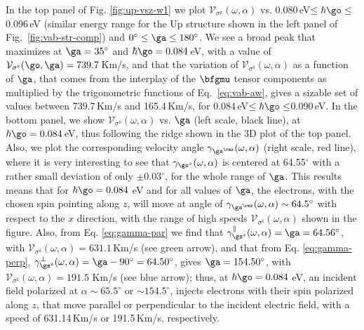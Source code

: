 \documentclass[floatfix,prb,aps,superscriptaddress,showpacs,11pt,preprint,letterpaper]{revtex4}
\begin{document}
In the top panel of Fig. \ref{fig:up-vsz-w1} we plot
$\mathcal{V}_{\sigma^{\mathrm{z}}} (\omega,\alpha)$ vs.
0.080\,eV$\leq\hbar\go\leq$0.096\,eV (similar energy range for the Up
structure shown in the left panel of Fig.~\ref{fig:vab-str-comp}) and
$0^\circ\leq\ga\leq 180^\circ$.
% 
We see a broad peak that maximizes at $\ga=35^{\circ}$ and $\hbar\go=
0.084$\,eV, with a value of $\mathcal{V}_{\sigma^{\mathrm{z}}}(\go,\ga) =
739.7$\,Km/s, and that the variation of $\mathcal{V}_{\sigma^{\mathrm{z}}}
(\omega,\alpha)$ as a function of $\ga$, that comes from the interplay of the
$\bfgmu$ tensor components as multiplied by the  trigonometric functions of
Eq.~\eqref{eq:vab-aw}, gives a sizable set of values between 739.7\,Km/s and
165.4\,Km/s, for 0.084\,eV$\leq\hbar\go\leq$0.090\,eV. 
% 
In the bottom panel, we show $\mathcal{V}_{\sigma^{\mathrm{z}}}
(\omega,\alpha)$ vs. $\ga$ (left scale, black line), at $\hbar\go= 0.084$\,eV,
thus following the ridge shown in the 3D plot of the top panel. 
Also,
we plot the
corresponding velocity angle $\gamma_{\gs^\rmz}(\omega,\alpha)$
(right scale, red line),
where it is very interesting to see that $\gamma_{\gs^z}(\omega,\alpha)$ is centered
at 64.55$^\circ$ with a rather small deviation of only $\pm 0.03^\circ$,
for the whole range of $\ga$. This results means that for $\hbar\go=0.084$ eV
and for all values of $\ga$, the electrons, with the chosen spin pointing along
$z$, will move at angle of $\gamma_{\gs^\rmz}(\omega,\alpha) \sim
64.5^{\circ}$ with respect to the $x$ direction, with the range of  high
speeds $\mathcal{V}_{\sigma^{\mathrm{z}}} (\omega,\alpha)$ shown in the figure.
% 
Also, from Eq. \eqref{eq:gamma-par} we find that
$\gamma^\parallel_{\gs^\mathrm{z}} (\omega,\alpha)=\ga = 64.56^\circ$, with
$\mathcal{V}_{\sigma^{\mathrm{z}}} (\omega,\alpha) = 631.1$\,Km/s (see green
arrow), and that from Eq. \eqref{eq:gamma-perp},
$\gamma^\perp_{\gs^\mathrm{z}}(\omega,\alpha)=\ga-90^\circ=64.50^\circ$,
gives $\ga=154.50^\circ$, with
$\mathcal{V}_{\sigma^{\mathrm{z}}}(\omega,\alpha) = 191.5$ Km/s (see blue
arrow); thus, at $\hbar\go=0.084$ eV, an incident field polarized at $\alpha
\sim 65.5^\circ$ or $\sim 154.5^\circ$, injects electrons with their spin
polarized along $z$, that move parallel or perpendicular to the incident
electric field,  with a speed of 631.14\,Km/s or 191.5\,Km/s, respectively.
\end{document}
